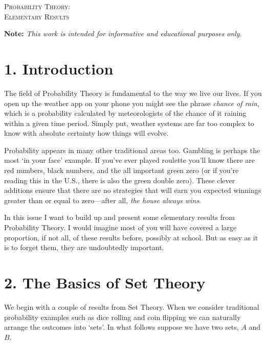 \documentclass[11pt]{article}
\begin{document}

\begin{tcolorbox}
\begin{center}
    \large
    \textsc{Probability Theory: \\ Elementary Results}
\end{center}
\end{tcolorbox}

\begin{center}
\textbf{Note:} \textit{This work is intended for informative and educational purposes only.}
\end{center}

\section*{1. Introduction}
The field of Probability Theory is fundamental to the way we live our lives. If you open up the weather app on your phone you might see the phrase \textit{chance of rain}, which is a probability calculated by meteorologists of the chance of it raining within a given time period. Simply put, weather systems are far too complex to know with absolute certainty how things will evolve. 

Probability appears in many other traditional areas too. Gambling is perhaps the most `in your face' example. If you've ever played roulette you'll know there are red numbers, black numbers, and the all important green zero (or if you're reading this in the U.S., there is also the green double zero). These clever additions ensure that there are no strategies that will earn you expected winnings greater than or equal to zero––after all, \textit{the house always wins}.

In this issue I want to build up and present some elementary results from Probability Theory. I would imagine most of you will have covered a large proportion, if not all, of these results before, possibly at school. But as easy as it is to forget them, they are undoubtedly important.

\section*{2. The Basics of Set Theory}
We begin with a couple of results from Set Theory. When we consider traditional probability examples such as dice rolling and coin flipping we can naturally arrange the outcomes into `sets'. In what follows suppose we have two sets, $A$ and $B$.
\end{document}
